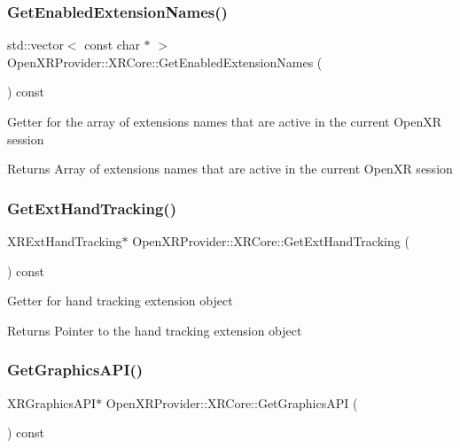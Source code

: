 \subsubsection{\texorpdfstring{GetEnabledExtensionNames()}{GetEnabledExtensionNames()}}
{\footnotesize\ttfamily std\+::vector$<$ const char $\ast$ $>$ Open\+X\+R\+Provider\+::\+X\+R\+Core\+::\+Get\+Enabled\+Extension\+Names (\begin{DoxyParamCaption}{ }\end{DoxyParamCaption}) const\hspace{0.3cm}{\ttfamily [inline]}}

Getter for the array of extensions names that are active in the current Open\+XR session \begin{DoxyReturn}{Returns}
Array of extensions names that are active in the current Open\+XR session 
\end{DoxyReturn}
\mbox{\label{class_open_x_r_provider_1_1_x_r_core_a087507fd11303714034a29d87b995eec}} 
\subsubsection{\texorpdfstring{GetExtHandTracking()}{GetExtHandTracking()}}
{\footnotesize\ttfamily X\+R\+Ext\+Hand\+Tracking$\ast$ Open\+X\+R\+Provider\+::\+X\+R\+Core\+::\+Get\+Ext\+Hand\+Tracking (\begin{DoxyParamCaption}{ }\end{DoxyParamCaption}) const\hspace{0.3cm}{\ttfamily [inline]}}

Getter for hand tracking extension object \begin{DoxyReturn}{Returns}
Pointer to the hand tracking extension object 
\end{DoxyReturn}
\mbox{\label{class_open_x_r_provider_1_1_x_r_core_a879f310d9e2c44bb6618df996e56a7a1}} 
\subsubsection{\texorpdfstring{GetGraphicsAPI()}{GetGraphicsAPI()}}
{\footnotesize\ttfamily X\+R\+Graphics\+A\+PI$\ast$ Open\+X\+R\+Provider\+::\+X\+R\+Core\+::\+Get\+Graphics\+A\+PI (\begin{DoxyParamCaption}{ }\end{DoxyParamCaption}) const\hspace{0.3cm}{\ttfamily [inline]}}

